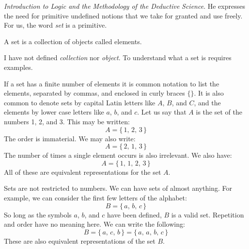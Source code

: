         \textit{Introduction to Logic and the Methodology of the Deductive}
        \textit{Science}. He expresses the need for primitive
        undefined notions that we take for granted and use freely. For us, the
        word \textit{set} is a primitive.
        \begin{definition}
            A \gls{set} is a collection of objects called elements.
        \end{definition}
        I have not defined \textit{collection} nor \textit{object}. To
        understand what a set is requires examples.
        \begin{example}
            If a set has a finite number of
            elements it is common notation to list the elements, separated by
            commas, and enclosed in curly braces $\{\}$. It is also common to
            denote sets by capital Latin letters like $A$, $B$, and $C$, and
            the elements by lower case letters like $a$, $b$, and $c$. Let us
            say that $A$ is the set of the numbers 1, 2, and 3.
            This may be written:
            \begin{equation}
                A=\{\,1,\,2,\,3\,\}
            \end{equation}
            The order is immaterial. We may also write:
            \begin{equation}
                A=\{\,2,\,1,\,3\,\}
            \end{equation}
            The number of times a single element occurs is also irrelevant. We
            also have:
            \begin{equation}
                A=\{\,1,\,1,\,2,\,3\,\}
            \end{equation}
            All of these are equivalent representations for the set $A$.
        \end{example}
        \begin{example}
            Sets are not restricted to numbers. We can have sets of almost
            anything. For example, we can consider the first few letters of
            the alphabet:
            \begin{equation}
                B=\{\,a,\,b,\,c\,\}
            \end{equation}
            So long as the symbols $a$, $b$, and $c$ have been defined, $B$ is
            a valid set. Repetition and order have no meaning here. We can write
            the following:
            \begin{equation}
                B=\{\,a,\,c,\,b\,\}=\{\,a,\,a,\,b,\,c\,\}
            \end{equation}
            These are also equivalent representations of the set $B$.
        \end{example}
